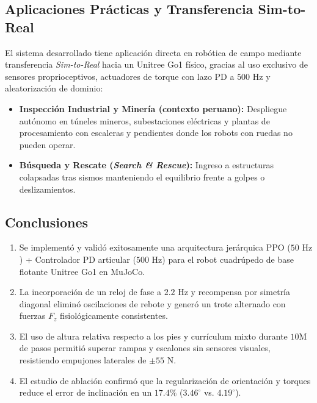 \documentclass[12pt,a4paper]{article}
\begin{document}
\subsection{Aplicaciones Prácticas y Transferencia Sim-to-Real}
El sistema desarrollado tiene aplicación directa en robótica de campo mediante transferencia \textit{Sim-to-Real} hacia un Unitree Go1 físico, gracias al uso exclusivo de sensores proprioceptivos, actuadores de torque con lazo PD a $500\text{ Hz}$ y aleatorización de dominio:
\begin{itemize}
    \item \textbf{Inspección Industrial y Minería (contexto peruano):} Despliegue autónomo en túneles mineros, subestaciones eléctricas y plantas de procesamiento con escaleras y pendientes donde los robots con ruedas no pueden operar.
    \item \textbf{Búsqueda y Rescate (\textit{Search \& Rescue}):} Ingreso a estructuras colapsadas tras sismos manteniendo el equilibrio frente a golpes o deslizamientos.
\end{itemize}

\subsection{Conclusiones}
\begin{enumerate}
    \item Se implementó y validó exitosamente una arquitectura jerárquica PPO ($50\text{ Hz}$) + Controlador PD articular ($500\text{ Hz}$) para el robot cuadrúpedo de base flotante Unitree Go1 en MuJoCo.
    \item La incorporación de un reloj de fase a $2.2\text{ Hz}$ y recompensa por simetría diagonal eliminó oscilaciones de rebote y generó un trote alternado con fuerzas $F_z$ fisiológicamente consistentes.
    \item El uso de altura relativa respecto a los pies y currículum mixto durante $10\text{M}$ de pasos permitió superar rampas y escalones sin sensores visuales, resistiendo empujones laterales de $\pm 55\text{ N}$.
    \item El estudio de ablación confirmó que la regularización de orientación y torques reduce el error de inclinación en un $17.4\%$ ($3.46^\circ$ vs. $4.19^\circ$).
\end{enumerate}
\end{document}
